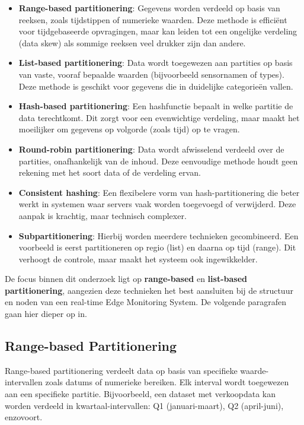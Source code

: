 \begin{itemize}
    \item \textbf{Range-based partitionering}: Gegevens worden verdeeld op basis van reeksen, zoals tijdstippen of numerieke waarden. Deze methode is efficiënt voor tijdgebaseerde opvragingen, maar kan leiden tot een ongelijke verdeling (data skew) als sommige reeksen veel drukker zijn dan andere.
    
    \item \textbf{List-based partitionering}: Data wordt toegewezen aan partities op basis van vaste, vooraf bepaalde waarden (bijvoorbeeld sensornamen of types). Deze methode is geschikt voor gegevens die in duidelijke categorieën vallen.
    
    \item \textbf{Hash-based partitionering}: Een hashfunctie bepaalt in welke partitie de data terechtkomt. Dit zorgt voor een evenwichtige verdeling, maar maakt het moeilijker om gegevens op volgorde (zoals tijd) op te vragen.
    
    \item \textbf{Round-robin partitionering}: Data wordt afwisselend verdeeld over de partities, onafhankelijk van de inhoud. Deze eenvoudige methode houdt geen rekening met het soort data of de verdeling ervan.
    
    \item \textbf{Consistent hashing}: Een flexibelere vorm van hash-partitionering die beter werkt in systemen waar servers vaak worden toegevoegd of verwijderd. Deze aanpak is krachtig, maar technisch complexer.
    
    \item \textbf{Subpartitionering}: Hierbij worden meerdere technieken gecombineerd. Een voorbeeld is eerst partitioneren op regio (list) en daarna op tijd (range). Dit verhoogt de controle, maar maakt het systeem ook ingewikkelder.
\end{itemize}

De focus binnen dit onderzoek ligt op \textbf{range-based} en \textbf{list-based partitionering}, aangezien deze technieken het best aansluiten bij de structuur en noden van een real-time Edge Monitoring System. De volgende paragrafen gaan hier dieper op in.

\subsection{Range-based Partitionering}
Range-based partitionering verdeelt data op basis van specifieke waarde-intervallen zoals datums of numerieke bereiken. Elk interval wordt toegewezen aan een specifieke partitie. Bijvoorbeeld, een dataset met verkoopdata kan worden verdeeld in kwartaal-intervallen: Q1 (januari-maart), Q2 (april-juni), enzovoort.

